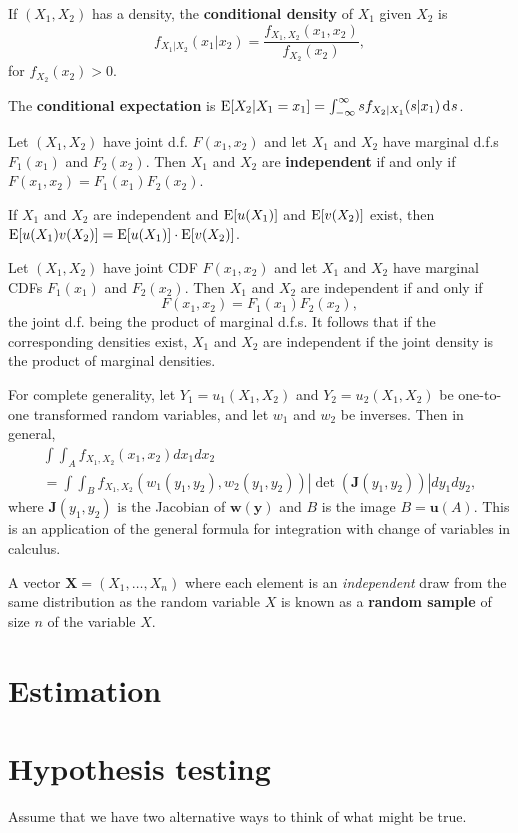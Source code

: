 \documentclass[twoside]{article}
\begin{document}
If $(X_1,X_2)$ has a density, the \textbf{conditional density} of $X_1$ given $X_2$ is
\[f_{X_1|X_2}(x_1|x_2)=\frac{f_{X_1,X_2}(x_1,x_2)}{f_{X_2}(x_2)},\]
for $f_{X_2}(x_2)>0$.

The \textbf{conditional expectation} is $\E[X_2|X_1=x_1] = \int_{-\infty}^\infty s
f_{X_2|X_1}(s|x_1) \rd s$.

Let $(X_1,X_2)$ have joint d.f. $F(x_1,x_2)$ and let $X_1$ and $X_2$ 
have marginal d.f.s $F_1(x_1)$
  and $F_2(x_2)$. Then $X_1$ and $X_2$ are \textbf{independent} if and only if 
$F(x_1,x_2)= F_1(x_1) F_2(x_2)$. 

If $X_1$ and $X_2$ are independent and $\operatorname{E}[u(X_1)]$ and $\operatorname{E}[v(X_2)]$ exist, then
$\operatorname{E}[u(X_1)v(X_2)] = \operatorname{E}[u(X_1)]\cdot \operatorname{E}[v(X_2)]$.


Let $(X_1,X_2)$ have joint CDF
  $F(x_1,x_2)$ and let $X_1$ and $X_2$ have marginal CDFs $F_1(x_1)$
  and $F_2(x_2)$. Then $X_1$ and $X_2$ are independent if and only if 
  \[F(x_1,x_2)= F_1(x_1) F_2(x_2),\]
  the joint d.f. being the product of marginal d.f.s. It follows that if the corresponding
  densities exist, $X_1$ and $X_2$ are independent if the joint
  density is the product of marginal densities.



For complete generality, let $Y_1=u_1(X_1,X_2)$ and $Y_2=u_2(X_1,X_2)$ be
one-to-one transformed random variables, and let $w_1$ and $w_2$ be inverses.
Then in general, 
\begin{multline*} \int\!\!\!\int_A f_{X_1,X_2}(x_1,x_2)dx_1 d x_2 \\
= \int\!\!\!\int_B
f_{X_1,X_2} (w_1(y_1,y_2),w_2(y_1,y_2))| \det(\mathbf{J}(y_1,y_2))| d y_1
dy_2,\end{multline*} 
where $\mathbf{J}(y_1,y_2)$ is the Jacobian of $\mathbf{w}(\mathbf{y})$ and $B$ is
the image $B=\mathbf{u}(A)$. This is an application of the general formula
for integration with change of variables in calculus.


A vector $\mathbf{X}=(X_1,\dots,X_n)$ where each element is an
\emph{independent} draw from the same distribution as the random variable $X$ is
known as a \textbf{random sample} of size $n$ of the variable $X$.

\section{Estimation}

\section{Hypothesis testing}
Assume that we have two alternative ways to think of what might
be true.
\end{document}
